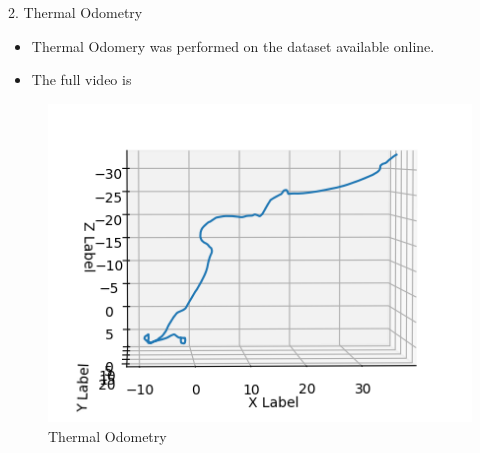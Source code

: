 \documentclass[10pt]{beamer}
\begin{document}
\begin{frame}{}
    \begin{description}
        \item[2. Thermal Odometry]
    \end{description}{}
    \begin{itemize}
        \item Thermal Odomery was performed on the dataset available online.
        \item The full video is  
    \end{itemize}
    \begin{figure}[h!]
        \centering
        \includegraphics[scale=0.45]{Thermal_odometry.png} 
        \caption{Thermal Odometry}
        \label{Fig:thermal_odometry}
    \end{figure}
        
\end{frame}
\end{document}
